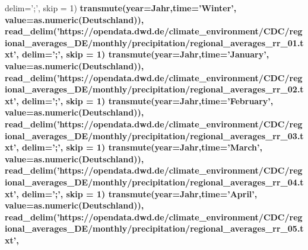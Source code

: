 \documentclass[
]{article}
\newenvironment{Shaded}{\begin{snugshade}}{\end{snugshade}}
\newcommand{\DataTypeTok}[1]{\textcolor[rgb]{0.13,0.29,0.53}{#1}}
\newcommand{\DecValTok}[1]{\textcolor[rgb]{0.00,0.00,0.81}{#1}}
\newcommand{\KeywordTok}[1]{\textcolor[rgb]{0.13,0.29,0.53}{\textbf{#1}}}
\newcommand{\NormalTok}[1]{#1}
\newcommand{\OperatorTok}[1]{\textcolor[rgb]{0.81,0.36,0.00}{\textbf{#1}}}
\newcommand{\StringTok}[1]{\textcolor[rgb]{0.31,0.60,0.02}{#1}}
\begin{document}
\begin{Shaded}
\begin{Highlighting}[]
{{{{{               \DataTypeTok{delim=}\StringTok{';'}\NormalTok{, }\DataTypeTok{skip =} \DecValTok{1}\NormalTok{) }\OperatorTok{%
\StringTok{      }\KeywordTok{transmute}\NormalTok{(}\DataTypeTok{year=}\NormalTok{Jahr,}\DataTypeTok{time=}\StringTok{'Winter'}\NormalTok{, }\DataTypeTok{value=}\KeywordTok{as.numeric}\NormalTok{(Deutschland)),}
    \KeywordTok{read_delim}\NormalTok{(}\StringTok{'https://opendata.dwd.de/climate_environment/CDC/regional_averages_DE/monthly/precipitation/regional_averages_rr_01.txt'}\NormalTok{,}
               \DataTypeTok{delim=}\StringTok{';'}\NormalTok{, }\DataTypeTok{skip =} \DecValTok{1}\NormalTok{) }\OperatorTok{%
\StringTok{      }\KeywordTok{transmute}\NormalTok{(}\DataTypeTok{year=}\NormalTok{Jahr,}\DataTypeTok{time=}\StringTok{'January'}\NormalTok{, }\DataTypeTok{value=}\KeywordTok{as.numeric}\NormalTok{(Deutschland)),}
    \KeywordTok{read_delim}\NormalTok{(}\StringTok{'https://opendata.dwd.de/climate_environment/CDC/regional_averages_DE/monthly/precipitation/regional_averages_rr_02.txt'}\NormalTok{,}
               \DataTypeTok{delim=}\StringTok{';'}\NormalTok{, }\DataTypeTok{skip =} \DecValTok{1}\NormalTok{) }\OperatorTok{%
\StringTok{      }\KeywordTok{transmute}\NormalTok{(}\DataTypeTok{year=}\NormalTok{Jahr,}\DataTypeTok{time=}\StringTok{'February'}\NormalTok{, }\DataTypeTok{value=}\KeywordTok{as.numeric}\NormalTok{(Deutschland)),}
    \KeywordTok{read_delim}\NormalTok{(}\StringTok{'https://opendata.dwd.de/climate_environment/CDC/regional_averages_DE/monthly/precipitation/regional_averages_rr_03.txt'}\NormalTok{,}
               \DataTypeTok{delim=}\StringTok{';'}\NormalTok{, }\DataTypeTok{skip =} \DecValTok{1}\NormalTok{) }\OperatorTok{%
\StringTok{      }\KeywordTok{transmute}\NormalTok{(}\DataTypeTok{year=}\NormalTok{Jahr,}\DataTypeTok{time=}\StringTok{'March'}\NormalTok{, }\DataTypeTok{value=}\KeywordTok{as.numeric}\NormalTok{(Deutschland)),}
    \KeywordTok{read_delim}\NormalTok{(}\StringTok{'https://opendata.dwd.de/climate_environment/CDC/regional_averages_DE/monthly/precipitation/regional_averages_rr_04.txt'}\NormalTok{,}
               \DataTypeTok{delim=}\StringTok{';'}\NormalTok{, }\DataTypeTok{skip =} \DecValTok{1}\NormalTok{) }\OperatorTok{%
\StringTok{      }\KeywordTok{transmute}\NormalTok{(}\DataTypeTok{year=}\NormalTok{Jahr,}\DataTypeTok{time=}\StringTok{'April'}\NormalTok{, }\DataTypeTok{value=}\KeywordTok{as.numeric}\NormalTok{(Deutschland)),}
    \KeywordTok{read_delim}\NormalTok{(}\StringTok{'https://opendata.dwd.de/climate_environment/CDC/regional_averages_DE/monthly/precipitation/regional_averages_rr_05.txt'}\NormalTok{,}
}}}}}}}}}}
\end{Highlighting}
\end{Shaded}
\end{document}

